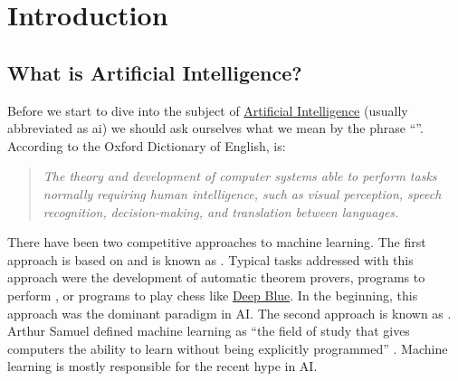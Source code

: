 \chapter{Introduction}

\section{What is Artificial Intelligence?}
Before we start to dive into the subject of
\href{https://en.wikipedia.org/wiki/Artificial_intelligence}{Artificial Intelligence} (usually abbreviated as
\ac{ai}) we should ask ourselves what we mean by the phrase ``''.
According to the Oxford Dictionary of English, 
 is:
\begin{quote}
  \colorbox{sepia}{\textsl{The theory and development of computer systems able to perform tasks normally}} \linebreak
  \colorbox{sepia}{\textsl{requiring human intelligence, such as visual perception, speech recognition,}}  \linebreak
  \colorbox{sepia}{\textsl{decision-making, and translation between languages.}} 
\end{quote}
There have been two competitive approaches to machine learning.  The first approach is based on
 and is known as .  
Typical tasks addressed with this approach were the development of automatic theorem provers, programs to
perform , or programs to play chess like
\href{https://en.wikipedia.org/wiki/Deep_Blue_(chess_computer)}{Deep Blue}.
In the beginning, this approach was the dominant paradigm in AI.
The second approach is known as .  Arthur Samuel defined machine learning as
``the field of study that gives computers the ability to learn without being
explicitly programmed'' \cite{samuel:1959}. 
Machine learning is mostly responsible for the recent hype in AI.

